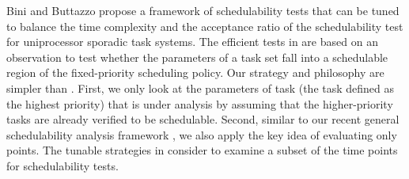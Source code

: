 \documentclass[10pt,conference]{IEEEtran}
\newcommand{\frameworkku}[1]{}
\begin{document}
Bini and Buttazzo \cite{DBLP:journals/tc/BiniB04} propose a framework
of schedulability tests that can be tuned to balance the time
complexity and the acceptance ratio of the schedulability test for
uniprocessor sporadic task systems.  The efficient tests in
\cite{DBLP:journals/tc/BiniB04} are based on an observation to test
whether the parameters of a task set fall into a schedulable region of
the fixed-priority scheduling policy.  Our strategy and philosophy are
simpler than \cite{DBLP:journals/tc/BiniB04}.  First, we only look at
the parameters of task  (the task defined as the 
highest priority) that is under analysis by assuming that the
higher-priority tasks are already verified to be schedulable. Second,
similar to our recent general schedulability analysis framework
\frameworkku{} \cite{ChenHLRTSS2015}, we also apply the key idea of evaluating only 
points.  The tunable strategies in \cite{DBLP:journals/tc/BiniB04}
consider to examine a subset of the time points for schedulability
tests.
\end{document}
